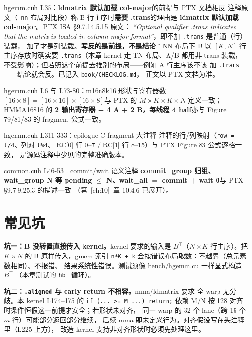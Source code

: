 \begin{kaogu}[F2]{hgemm.cuh L35：\textbf{ldmatrix 默认加载 col-major}的前提与 PTX 文档相反}
  注释原文（\texttt{\_nn} 布局对比段）称 B 行主序时\textbf{需要 .trans}的理由是
  \textbf{ldmatrix 默认加载 col-major}。PTX ISA §9.7.14.5.15 原文：
  \emph{``Optional qualifier .trans indicates that the matrix is loaded in
  column-major format''}，即不加 \texttt{.trans} 是普通（行）装载，
  加了才是列装载。\textbf{写反的是前提，不是结论}：NN 布局下 B 以 $[K,N]$
  行主序存放时确实要 \texttt{.trans}（本章 kernel 走 TN 布局、A/B 都用非
  trans 装载，不受影响）；但若照这个前提去推别的布局——例如 A 行主序该不该
  加 \texttt{.trans}——结论就会反。已记入 \texttt{book/\allowbreak{}CHECKLOG.\allowbreak{}md}，
  正文以 PTX 文档为准。
\end{kaogu}

\begin{kaogu}[F2 核校通过]{hgemm.cuh L6 与 L73-80：m16n8k16 形状与寄存器数}
  \textbf{$[16\times8] = [16\times16]\times[16\times8]$}与 PTX 的
  $M{\times}K \times K{\times}N$ 定义一致；HMMA16816 的
  \textbf{2 输出寄存器 + 4 A + 2 B，每线程 4 half}亦与
  Figure 79/81/83 的 fragment 公式一致。
\end{kaogu}

\begin{kaogu}[F2 核校通过]{hgemm.cuh L311-333：epilogue C fragment 大注释}
  注释的行/列映射（\texttt{row = t/4}、列对 \texttt{t\%4}、
  RC[0] 行 0--7 / RC[1] 行 8--15）与 PTX Figure 83 公式逐格一致，
  是源码注释中少见的完整准确版本。
\end{kaogu}

\begin{kaogu}[F3 核校通过]{common.cuh L46-53：commit/wait 语义注释}
  \textbf{commit\_group 归组、wait\_group N 等 pending $\le$ N、wait\_all $=$
  commit + wait 0}与 PTX §9.7.9.25.3 的描述一致
  （第~\ref{ch:10}~章 10.4.6 已展开）。
\end{kaogu}

\section{常见坑}

\textbf{坑一：B 没转置直接传入 kernel。}\allowbreak{}kernel 要求的输入是 $B^{\top}$（$N\times K$
行主序）。把 $K\times N$ 的 B 原样传入，gmem 索引
\texttt{n*K + k} 会按错误布局取数：不越界（总元素数相同）、不报错、
结果系统性错误。测试须像 bench/hgemm.cu 一样显式构造 $B^{\top}$
（本章测试的 \texttt{hbt} 循环）。

\textbf{坑二：\texttt{.aligned} 与 early return 不相容。}\allowbreak{}mma/ldmatrix 要求
全 warp 无分歧。本 kernel L174--175 的
\texttt{if (... >= M ...) return;} 依赖
M/N 按 128 对齐时条件恒假这一前提才安全；若形状未对齐，
同一 warp 的 32 个 lane（跨 16 个 $m$ 行）可能部分返回部分继续，
后续 mma 即未定义行为。对齐假设写在头注释里（L225 上方），
改造 kernel 支持非对齐形状时必须先处理这里。

